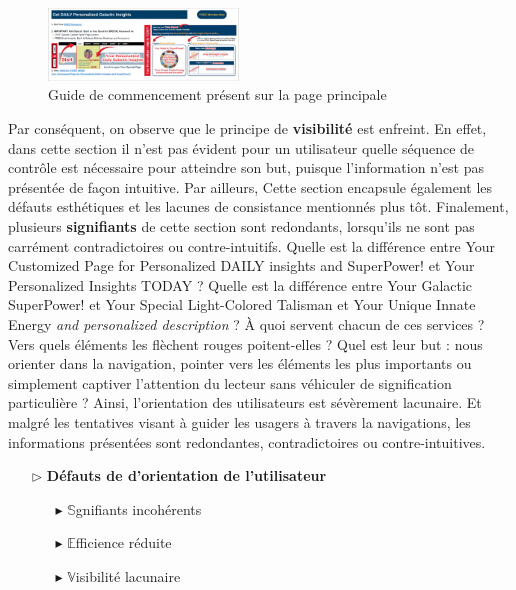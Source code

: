 \documentclass[9pt]{report}
\newcommand{\mathpazott}{\fontfamily{pplj}\selectfont}
\renewcommand{\texttt}[1]{{\scriptsize\mathpazott #1}}
\begin{document}
\begin{multicols*}{2}
  \begin{figure}[H]
    \begin{center}
      \includegraphics[width=0.45\textwidth]{Orientation.png}
    \end{center}
    \caption{Guide de commencement présent sur la page principale}
  \end{figure}

    Par conséquent, on observe que le principe de \textbf{visibilité} 
    est enfreint. En effet, dans cette section il n'est pas 
    évident pour un utilisateur quelle séquence de contrôle est 
    nécessaire pour atteindre son but, puisque l'information 
    n'est pas présentée de façon intuitive. 
    Par ailleurs, Cette section 
    encapsule également les défauts esthétiques et les 
    lacunes de consistance mentionnés plus tôt. Finalement, plusieurs 
    \textbf{signifiants} de cette section sont redondants, 
    lorsqu'ils ne sont pas carrément contradictoires ou 
    contre-intuitifs. Quelle est la différence entre 
  \texttt{Your Customized Page for Personalized DAILY insights and SuperPower!}  et \texttt{Your Personalized Insights TODAY} ? Quelle est la différence 
  entre \texttt{Your Galactic SuperPower!} et \texttt{Your Special Light-Colored Talisman} et \texttt{Your Unique Innate Energy \textit{and personalized description}} ? À quoi servent chacun de ces services ? Vers quels éléments 
  les flèchent rouges poitent-elles ? Quel est leur but : nous orienter 
  dans la navigation, pointer vers les éléments les plus importants 
  ou simplement captiver l'attention du lecteur sans véhiculer de 
  signification particulière ? Ainsi, l'orientation des utilisateurs 
  est sévèrement lacunaire. Et malgré les tentatives visant à guider les usagers à travers la navigations, les informations présentées 
  sont redondantes, contradictoires ou contre-intuitives. 


  
  \begin{itemize}
    \item [$\rhd$ ] \textbf{Défauts de d'orientation de l'utilisateur}  
      \begin{itemize}
        \item [$\blacktriangleright$ ] $\mathbb{S}$gnifiants incohérents
        \item [$\blacktriangleright$ ] $\mathbb{E}$fficience réduite
        \item [$\blacktriangleright$ ] $\mathbb{V}$isibilité lacunaire 
      \end{itemize}
  \end{itemize}


\end{multicols*}
\end{document}

